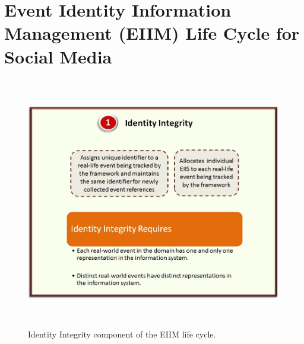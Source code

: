 
\chapter{Event Identity Information Management (EIIM) Life Cycle for Social Media} %

\label{eiim} %






\begin{figure}[htbp]
  \caption{Identity Integrity component of the EIIM life cycle.}
  \centering
    \includegraphics[width=14cm,height=11cm]{Figures/EIIMComponents/IdentityIntegrity.jpg}
\end{figure}

